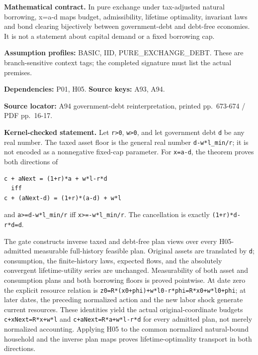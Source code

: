 \documentclass[
  11pt,
]{article}
\let\LedgerOriginalTexttt\texttt
\renewcommand{\texttt}[1]{{\small\LedgerOriginalTexttt{#1}}}
\begin{document}
\textbf{Mathematical contract.} In pure exchange under tax-adjusted
natural borrowing, x=a-d maps budget, admissibility, lifetime
optimality, invariant laws and bond clearing bijectively between
government-debt and debt-free economies. It is not a statement about
capital demand or a fixed borrowing cap.

\textbf{Assumption profiles:} BASIC, IID, PURE\_EXCHANGE\_DEBT. These
are branch-sensitive context tags; the completed signature must list the
actual premises.

\textbf{Dependencies:} P01, H05. \textbf{Source keys:} A93, A94.

\textbf{Source locator:} A94 government-debt reinterpretation, printed
pp.~673-674 / PDF pp.~16-17.

\textbf{Kernel-checked statement.} Let \texttt{r\textgreater{}0},
\texttt{w\textgreater{}0}, and let government debt \texttt{d} be any
real number. The taxed asset floor is the general real number
\texttt{d-w*l\_min/r}; it is not encoded as a nonnegative fixed-cap
parameter. For \texttt{x=a-d}, the theorem proves both directions of

\begin{verbatim}
c + aNext = (1+r)*a + w*l-r*d
  iff
c + (aNext-d) = (1+r)*(a-d) + w*l
\end{verbatim}

and \texttt{a\textgreater{}=d-w*l\_min/r} iff
\texttt{x\textgreater{}=-w*l\_min/r}. The cancellation is exactly
\texttt{(1+r)*d-r*d=d}.

The gate constructs inverse taxed and debt-free plan views over every
H05-admitted measurable full-history feasible plan. Original assets are
translated by \texttt{d}; consumption, the finite-history laws, expected
flows, and the absolutely convergent lifetime-utility series are
unchanged. Measurability of both asset and consumption plans and both
borrowing floors is proved pointwise. At date zero the explicit resource
relation is \texttt{z0=R*(x0+phi)+w*l0-r*phi=R*x0+w*l0+phi}; at later
dates, the preceding normalized action and the new labor shock generate
current resources. These identities yield the actual original-coordinate
budgets \texttt{c+xNext=R*x+w*l} and \texttt{c+aNext=R*a+w*l-r*d} for
every admitted plan, not merely normalized accounting. Applying H05 to
the common normalized natural-bound household and the inverse plan maps
proves lifetime-optimality transport in both directions.
\end{document}
